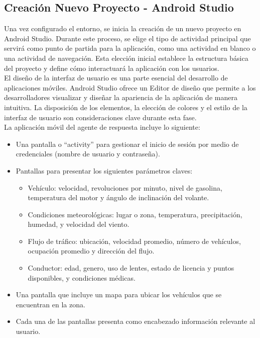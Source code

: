 \documentclass[a4paper,10pt, oneside, titlepage]{article}
\begin{document}
	\subsection{Creación Nuevo Proyecto - Android Studio}\label{Nuevo_Android}
	Una vez configurado el entorno, se inicia la creación de un nuevo proyecto en Android Studio. Durante este proceso, se elige el tipo de actividad principal que servirá como punto de partida para la aplicación, como una actividad en blanco o una actividad de navegación. Esta elección inicial establece la estructura básica del proyecto y define cómo interactuará la aplicación con los usuarios. \\\newline
	\indent El diseño de la interfaz de usuario es una parte esencial del desarrollo de aplicaciones móviles. Android Studio ofrece un Editor de diseño que permite a los desarrolladores visualizar y diseñar la apariencia de la aplicación de manera intuitiva. La disposición de los elementos, la elección de colores y el estilo de la interfaz de usuario son consideraciones clave durante esta fase. \\\newline
	\indent La aplicación móvil del agente de respuesta incluye lo siguiente:
	\begin{itemize}
		\item Una pantalla o ``activity'' para gestionar el inicio de sesión por medio de credenciales (nombre de usuario y contraseña).
		\item Pantallas para presentar los siguientes parámetros claves:
		\begin{itemize}
			\item Vehículo: velocidad, revoluciones por minuto, nivel de gasolina, temperatura del motor y ángulo de inclinación del volante.
			\item Condiciones meteorológicas: lugar o zona, temperatura, precipitación, humedad, y velocidad del viento.
			\item Flujo de tráfico: ubicación, velocidad promedio, número de vehículos, ocupación promedio y dirección del flujo.
			\item Conductor: edad, genero, uso de lentes, estado de licencia y puntos disponibles, y condiciones médicas.
		\end{itemize}
		\item Una pantalla que incluye un mapa para ubicar los vehículos que se encuentran en la zona.
		\item Cada una de las pantallas presenta como encabezado información relevante al usuario.
	\end{itemize}
\end{document}
